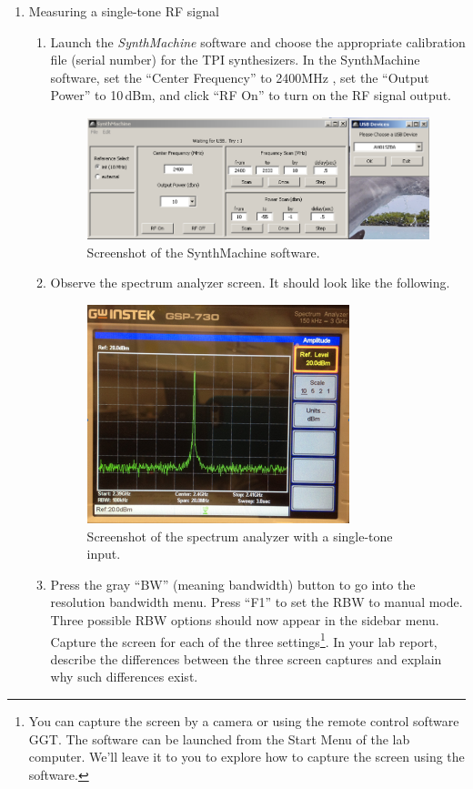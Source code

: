 \documentclass[letterpaper, 11pt]{article}
\begin{document}
\begin{enumerate}
	\item Measuring a single-tone RF signal
		\begin{enumerate}
			\item Launch the \textit{SynthMachine} software and choose the appropriate calibration file (serial number) for the TPI synthesizers. In the SynthMachine software, set the ``Center Frequency'' to 2400\.MHz , set the ``Output Power'' to 10\,dBm, and click ``RF On'' to turn on the RF signal output. 
				\begin{figure}[h]
					\centering
					\includegraphics[width=5in]{synth-machine}
					\caption{Screenshot of the SynthMachine software.}
					\label{fig:synth-machine}
				\end{figure}
							
			\item Observe the spectrum analyzer screen. It should look like the following. 
				\begin{figure}[h]
					\centering
					\includegraphics[width=3in]{sa-single-tone}
					\caption{Screenshot of the spectrum analyzer with a single-tone input.}
					\label{fig:sa-single-tone}
				\end{figure}		
									
			\item Press the gray ``BW'' (meaning bandwidth) button to go into the resolution bandwidth menu. Press ``F1'' to set the RBW to manual mode. Three possible RBW options should now appear in the sidebar menu. Capture the screen for each of the three settings\footnote{You can capture the screen by a camera or using the remote control software GGT. The software can be launched from the Start Menu of the lab computer. We'll leave it to you to explore how to capture the screen using the software.}. In your lab report, describe the differences between the three screen captures and explain why such differences exist.
							

\end{enumerate}
\end{enumerate}
\end{document}
